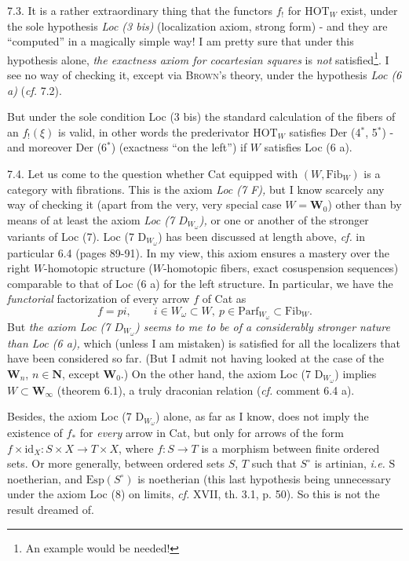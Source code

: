 7.3. It is a rather extraordinary thing that the functors $f_!$ for $\mathrm{HOT}_W$ exist, under the sole hypothesis \textit{Loc (3 bis)} (localization axiom, strong form) - and they are ``computed'' in a magically simple way! I am pretty sure that under this hypothesis alone, \textit{the exactness axiom for cocartesian squares} is \textit{not} satisfied\footnote[47]{An example would be needed!}. I see no way of checking it, except via \textsc{Brown}'s theory, under the hypothesis \textit{Loc (6 a)} (\textit{cf.} 7.2).

But under the sole condition Loc (3 bis) the standard calculation of the fibers of an $f_!(\xi)$
is valid, in other words the prederivator $\mathrm{HOT}_W$ satisfies Der (4$^*$, 5$^*$) - and moreover Der (6$^*$) (exactness ``on the left'') if $W$ satisfies Loc (6 a). %

7.4. Let us come to the question whether Cat equipped with $(W,\mathrm{Fib}_W)$ is a category with fibrations. This is the axiom \textit{Loc (7 F),} but I know scarcely any way of checking it (apart from the very, very special case $W = \mathbf{W}_0$) other than by means of at least the axiom \textit{Loc (7 $D_{W_\omega}$),} or one or another of the stronger variants of Loc (7). Loc (7 $\mathrm{D}_{W_\omega}$) has been discussed at length above, \textit{cf.} in particular 6.4 (pages 89-91). In my view, this axiom ensures a mastery over the right $W$-homotopic structure ($W$-homotopic fibers, exact cosuspension sequences) comparable to that of Loc (6 a) for the
left structure. In particular, we have the \textit{functorial} factorization of every arrow $f$ of Cat as
\[
f = pi, \qquad i \in W_\omega \subset W,\ p \in \mathrm{Parf}_{W_\omega} \subset \mathrm{Fib}_W .
\]
But \textit{the axiom Loc (7 $D_{W_\omega}$) seems to me to be of a considerably stronger nature than Loc (6 a),} which (unless I am mistaken) is satisfied for all the localizers that have been considered so far. (But I admit not having looked at the case of the $\mathbf{W}_n$, $n \in \mathbf{N}$, except $\mathbf{W}_0$.) On the other hand, the axiom Loc (7 $\mathrm{D}_{W_\omega}$) implies $W \subset \mathbf{W}_\infty$ (theorem 6.1), a truly draconian relation (\textit{cf.} comment 6.4 a).

Besides, the axiom Loc (7 $\mathrm{D}_{W_\omega}$) alone, as far as I know, does not imply the existence of $f_*$ for \textit{every} arrow in Cat, but only for
arrows of the form $f \times \mathrm{id}_X : S \times X \longrightarrow T \times X$, where $f : S \longrightarrow T$ is a morphism between finite ordered sets. Or more generally, between ordered sets $S$, $T$ such that $S^\circ$ is artinian, \textit{i.e.} $\mathrm{S}$ noetherian, and $\mathrm{Esp}(S^\circ)$ is noetherian (this last hypothesis being unnecessary under the axiom Loc (8) on limits, \textit{cf.} XVII, th. 3.1, p. 50). So this is not the result dreamed of.

